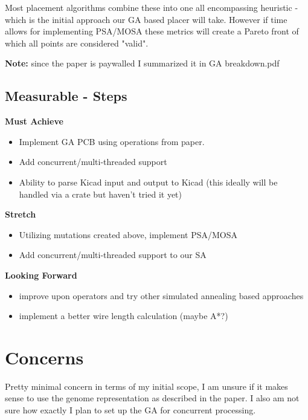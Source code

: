 \documentclass{article}
\begin{document}
Most placement algorithms combine these into one all encompassing heuristic - which is the initial approach our GA based placer will take. However if time allows for implementing PSA/MOSA these metrics will create a Pareto front of which all points are considered "valid". 

\textbf{Note:} since the paper is paywalled I summarized it in GA breakdown.pdf
\subsection{Measurable - Steps }

\noindent\textbf{Must Achieve}
\begin{itemize}

    \item Implement GA PCB using operations from paper. 
    \item Add concurrent/multi-threaded support
    \item Ability to parse Kicad input and output to Kicad (this ideally will be handled via a crate but haven't tried it yet)
\end{itemize}


\noindent\textbf{Stretch}
\begin{itemize}
    \item Utilizing mutations created above, implement PSA/MOSA 
    \item Add concurrent/multi-threaded support to our SA 
\end{itemize}

\noindent\textbf{Looking Forward}
\begin{itemize}
    \item improve upon operators and try other simulated annealing based approaches
    \item implement a better wire length calculation (maybe A*?)
\end{itemize}

\section{Concerns}
Pretty minimal concern in terms of my initial scope, I am unsure if it makes sense to use the genome representation as described in the paper. I also am not sure how exactly I plan to set up the GA for concurrent processing. 
\end{document}
